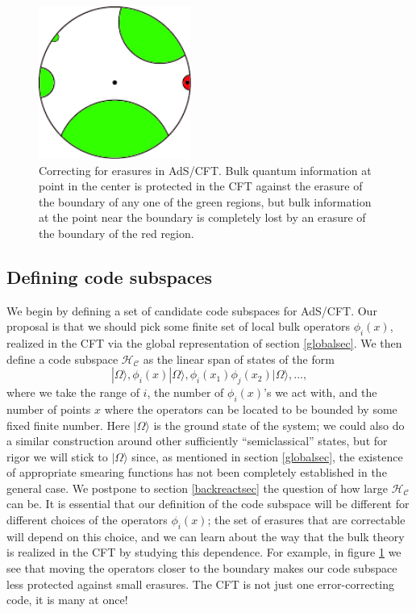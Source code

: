 \documentclass[12pt]{article}
\newcommand{\be}{\begin{equation}}
\newcommand{\ee}{\end{equation}}
\newcommand{\HC}{\mathcal{H}_{\mathcal{C}}}
\newcommand{\ran}{\rangle}
\begin{document}
\begin{figure}
\begin{center}
\includegraphics[height=5cm]{erasures.pdf}
\caption{Correcting for erasures in AdS/CFT.  Bulk quantum information at point in the center is protected in the CFT against the erasure of the boundary of any one of the green regions, but bulk information at the point near the boundary is completely lost by an erasure of the boundary of the red region.}\label{erasures}
\end{center}
\end{figure}

\subsection{Defining code subspaces}
We begin by defining a set of candidate code subspaces for AdS/CFT. Our proposal is that we should pick some finite set of local bulk operators $\phi_i(x)$, realized in the CFT via the global representation of section \ref{globalsec}.  We then define a code subspace $\HC$ as the linear span of states of the form
\be\label{bulkcode}
|\Omega\ran, \phi_i(x)|\Omega\ran, \phi_i(x_1)\phi_j(x_2)|\Omega\ran,\ldots,
\ee
where we take the range of $i$, the number of $\phi_i(x)$'s we act with, and the number of points $x$ where the operators can be located to be bounded by some fixed finite number.  Here $|\Omega\ran$ is the ground state of the system; we could also do a similar construction around other sufficiently ``semiclassical'' states, but for rigor we will stick to $|\Omega\ran$ since, as mentioned in section \ref{globalsec}, the existence of appropriate smearing functions has not been completely established in the general case.  We postpone to section \ref{backreactsec} the question of how large $\HC$ can be.  It is essential that our definition of the code subspace will be different for different choices of the operators $\phi_i(x)$; the set of erasures that are correctable will depend on this choice, and we can learn about the way that the bulk theory is realized in the CFT by studying this dependence.  For example, in figure \ref{erasures} we see that moving the operators closer to the boundary makes our code subspace less protected against small erasures.  The CFT is not just one error-correcting code, it is many at once!  
\end{document}
